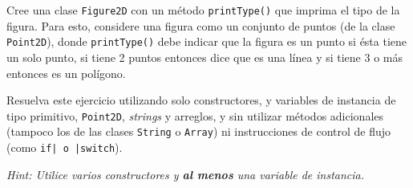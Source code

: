     \begin{exercise}
      Cree una clase \texttt{Figure2D} con un método \texttt{printType()}
      que imprima el tipo de la figura.
      Para esto, considere una figura como un conjunto de puntos (de la clase 
      \texttt{Point2D}), donde \texttt{printType()} debe indicar que 
      la figura es un punto si ésta tiene un solo punto, si tiene 2 puntos entonces dice 
      que es una línea y si tiene 3 o más entonces es un polígono.

      Resuelva este ejercicio utilizando solo constructores, y variables de instancia de 
      tipo primitivo, \texttt{Point2D}, \textit{strings} y arreglos, y sin 
      utilizar métodos adicionales (tampoco los de las clases \texttt{String} o 
      \texttt{Array}) ni instrucciones de control de flujo (como 
      \texttt{if| o |switch}).

      \textit{Hint: Utilice varios constructores y \textbf{al menos} una variable de 
      instancia.}
    \end{exercise}
%